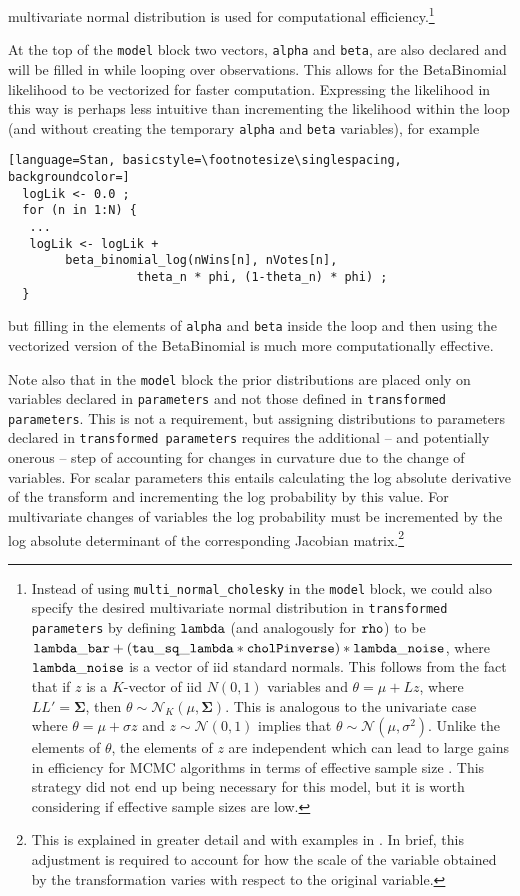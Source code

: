 multivariate normal distribution is used for computational efficiency.\footnote{Instead of using 
{\tt multi\_normal\_cholesky} in the {\tt model} block, we could also specify the desired multivariate 
normal distribution in {\tt transformed parameters} by defining ${\tt lambda}$ (and analogously 
for ${\tt rho}$) to be  ${\tt lambda\_bar + (tau\_sq\_lambda * cholPinverse) * lambda\_noise}$, 
where ${\tt lambda\_noise}$ is a vector of iid standard normals. This follows from the fact that if 
$z$ is a $K$-vector of iid $N(0,1)$ variables and $\theta = \mu + L z$, where $LL' = \boldsymbol{\Sigma}$, 
then $\theta \sim \mathcal{N}_K (\mu, \boldsymbol{\Sigma})$. This is analogous to the univariate case 
where $\theta = \mu + \sigma z$ and $z \sim \mathcal{N}(0,1)$ implies that 
$\theta \sim \mathcal{N}(\mu, \sigma^2)$. Unlike the elements of $\theta$, the elements of $z$ are 
independent which can lead to large gains in efficiency for MCMC algorithms in terms of effective 
sample size . This strategy did not end up being 
necessary for this model, but it is worth considering if effective sample sizes are low.} 

At the top of the {\tt model} block two vectors, {\tt alpha} and {\tt beta}, are also declared 
and will be filled in while looping over observations. This allows for the BetaBinomial likelihood 
to be vectorized for faster computation. Expressing the likelihood in this way is perhaps less 
intuitive than incrementing the likelihood within the loop (and without creating the temporary 
{\tt alpha} and {\tt beta} variables), for example

\begin{lstlisting}[language=Stan, basicstyle=\footnotesize\singlespacing, backgroundcolor=]
  logLik <- 0.0 ;
  for (n in 1:N) {
   ...
   logLik <- logLik +
   		beta_binomial_log(nWins[n], nVotes[n], 
   				  theta_n * phi, (1-theta_n) * phi) ;
  }
\end{lstlisting}
%
\noindent but filling in the elements of {\tt alpha} and {\tt beta} inside the loop and then using the 
vectorized version of the BetaBinomial is much more computationally effective. 

Note also that in the {\tt model} block the prior distributions are placed only on variables declared 
in {\tt parameters}  and not those defined in {\tt transformed parameters}. This is not a requirement, 
but assigning distributions to parameters declared in {\tt transformed parameters} requires the 
additional -- and potentially onerous -- step of accounting for changes in curvature due to the 
change of variables. For scalar parameters this entails calculating the log absolute derivative of 
the transform and incrementing the log probability by this value. For multivariate changes of variables 
the log probability must be incremented by the log absolute determinant of the corresponding 
Jacobian matrix.\footnote{This is explained in greater detail and with examples in . 
In brief, this adjustment is required to account for how the scale of the variable obtained by the 
transformation varies with respect to the original variable.}






